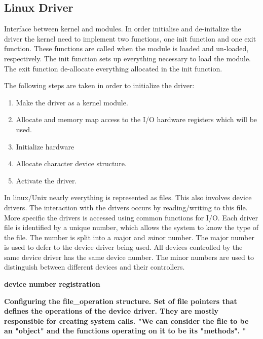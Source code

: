 \subsection{Linux Driver}
Interface between kernel and modules. In order initialise and de-initalize the driver the kernel need to implement two functions, one init function and one exit function. These functions are called when the module is loaded and un-loaded, respectively. The init function sets up everything necessary to load the module. The exit function de-allocate everything allocated in the init function. 

The following steps are taken in order to initialize the driver:

\begin{enumerate}
    \item Make the driver as a kernel module.
    \item Allocate and memory map access to the I/O hardware registers which will be used. 
    \item Initialize hardware
    \item Allocate character device structure. 
    \item Activate the driver.
\end{enumerate}







In linux/Unix nearly everything is represented as files. This also involves device drivers. The interaction with the drivers occurs by reading/writing to this file. More specific the drivers is accessed  using common functions for I/O. Each driver file is identified by a unique number, which allows the system to know the type of the file. The number is split into a \emph major and \emph minor number. The major number is used to defer to the device driver being used. All devices controlled by the same device driver has the same device number. The minor numbers are used to distinguish between different devices and their controllers. 



{\bf device number registration}


{\bf Configuring the file\_operation structure. Set of file pointers that defines the operations of the device driver. They are mostly responsible for creating system calls. "We can consider the file to be an "object" and the functions operating on it to be its "methods". "}



